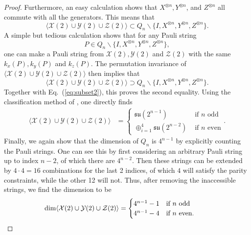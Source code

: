 \documentclass[12pt, a4-paper]{amsart}
\newcommand{\cX}{\mathcal{X}}
\newcommand{\cY}{\mathcal{Y}}
\newcommand{\cZ}{\mathcal{Z}}
\newcommand{\mf}[1]{\mathfrak{#1}}
\numberwithin{equation}{section}
\begin{document}
\begin{proof}
    Furthermore, an easy calculation shows that $X^{\otimes n}, Y^{\otimes n}$, and $Z^{\otimes n}$ all commute with all the generators. This means that \begin{equation}\label{eq:subset2}
        \langle \cX(2) \cup \cY(2) \cup \cZ(2) \rangle \subset Q_n \backslash \{I, X^{\otimes n}, Y^{\otimes n}, Z^{\otimes n} \}.
    \end{equation} 
A simple but tedious calculation shows that for any Pauli string 
     \[ P \in Q_n \backslash \{I, X^{\otimes n}, Y^{\otimes n}, Z^{\otimes n} \} ,\] 
one can make a Pauli string from $\cX(2), \cY(2)$ and $\cZ(2)$ with the same $k_x(P), k_y(P)$ and $k_z(P)$. The permutation invariance of $\langle \cX(2) \cup \cY(2) \cup \cZ(2) \rangle$ then implies that
    \begin{equation}
        \langle \cX(2) \cup \cY(2) \cup \cZ(2) \rangle \supset Q_n \backslash \{I, X^{\otimes n}, Y^{\otimes n}, Z^{\otimes n} \}.
    \end{equation}
    Together with Eq.~(\ref{eq:subset2}), this proves the second equality. Using the classification method of \cite{Aguilar2024FullClassificationLie}, one directly finds
    \begin{align*}
        \langle \cX(2) \cup \cY(2) \cup \cZ(2) \rangle &= \begin{cases}
            \mf{su}(2^{n-1}) &\text{ if $n$ odd} \\
            \oplus_{i=1}^{4}\mf{su}(2^{n-2}) &\text{ if $n$ even}
        \end{cases}.
    \end{align*}
Finally, we again show that the dimension of $Q_n$ is $4^{n-1}$ by explicitly counting the Pauli strings. One can see this by first considering an arbitrary Pauli string up to index $n-2$, of which there are $4^{n-2}$. Then these strings can be extended by $4\cdot 4=16$ combinations for the last 2 indices, of which $4$ will satisfy the parity constraints, while the other 12 will not. Thus, after removing the inaccessible strings, we find the dimension to be
    \begin{align*}
    \operatorname{dim}\langle \cX(2) \cup \cY(2) \cup \cZ(2) \rangle & =
        \begin{cases}
            4^{n-1}-1 \quad \text{if } n \text{ odd} \\
            4^{n-1}-4 \quad \text{if } n \text{ even}.  
        \end{cases}\qedhere
    \end{align*}
\end{proof}
\end{document}
